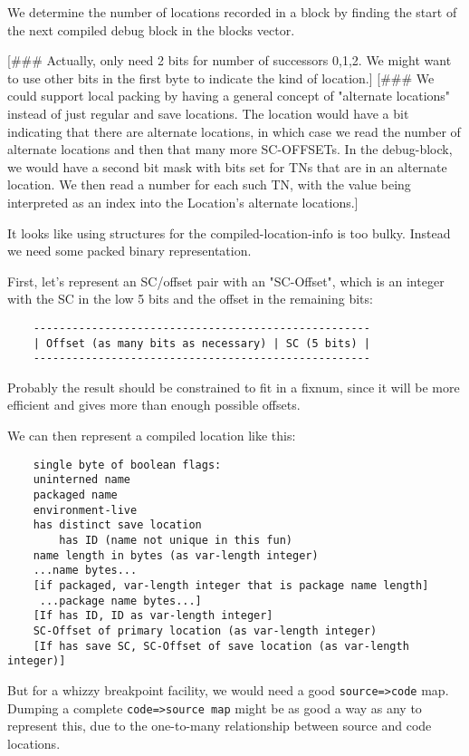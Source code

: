We determine the number of locations recorded in a block by finding the
start of the next compiled debug block in the blocks vector.

[\#\#\# Actually, only need 2 bits for number of successors {0,1,2}.  We might
want to use other bits in the first byte to indicate the kind of location.]
[\#\#\# We could support local packing by having a general concept of "alternate
locations" instead of just regular and save locations.  The location would have
a bit indicating that there are alternate locations, in which case we read the
number of alternate locations and then that many more SC-OFFSETs.  In the
debug-block, we would have a second bit mask with bits set for TNs that are in
an alternate location.  We then read a number for each such TN, with the value
being interpreted as an index into the Location's alternate locations.]



It looks like using structures for the compiled-location-info is too bulky.
Instead we need some packed binary representation.

First, let's represent an SC/offset pair with an "SC-Offset", which is an
integer with the SC in the low 5 bits and the offset in the remaining bits:
\begin{verbatim}
    ----------------------------------------------------
    | Offset (as many bits as necessary) | SC (5 bits) |
    ----------------------------------------------------
\end{verbatim}
Probably the result should be constrained to fit in a fixnum, since it will be
more efficient and gives more than enough possible offsets.

We can then represent a compiled location like this:
\begin{verbatim}
    single byte of boolean flags:
	uninterned name
	packaged name
	environment-live
	has distinct save location
        has ID (name not unique in this fun)
    name length in bytes (as var-length integer)
    ...name bytes...
    [if packaged, var-length integer that is package name length]
     ...package name bytes...]
    [If has ID, ID as var-length integer]
    SC-Offset of primary location (as var-length integer)
    [If has save SC, SC-Offset of save location (as var-length integer)]
\end{verbatim}




But for a whizzy breakpoint facility, we would need a good \verb+source=>code+ map.
Dumping a complete \verb+code=>source map+ might be as good a way as any to represent
this, due to the one-to-many relationship between source and code locations.

